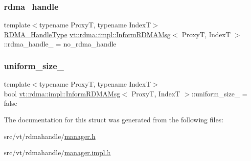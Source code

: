 \subsubsection{\texorpdfstring{rdma\+\_\+handle\+\_\+}{rdma\_handle\_}}
{\footnotesize\ttfamily template$<$typename ProxyT, typename IndexT$>$ \\
\hyperlink{namespacevt_a10442579ec4e7ebef223818e64bcf908}{R\+D\+M\+A\+\_\+\+Handle\+Type} \hyperlink{structvt_1_1rdma_1_1impl_1_1_inform_r_d_m_a_msg}{vt\+::rdma\+::impl\+::\+Inform\+R\+D\+M\+A\+Msg}$<$ ProxyT, IndexT $>$\+::rdma\+\_\+handle\+\_\+ = no\+\_\+rdma\+\_\+handle}

\mbox{\label{structvt_1_1rdma_1_1impl_1_1_inform_r_d_m_a_msg_a863c6d2d07d1cd4dc8ff73e4a3f052c2}} 
\subsubsection{\texorpdfstring{uniform\+\_\+size\+\_\+}{uniform\_size\_}}
{\footnotesize\ttfamily template$<$typename ProxyT, typename IndexT$>$ \\
bool \hyperlink{structvt_1_1rdma_1_1impl_1_1_inform_r_d_m_a_msg}{vt\+::rdma\+::impl\+::\+Inform\+R\+D\+M\+A\+Msg}$<$ ProxyT, IndexT $>$\+::uniform\+\_\+size\+\_\+ = false}



The documentation for this struct was generated from the following files\+:\begin{DoxyCompactItemize}
\item 
src/vt/rdmahandle/\hyperlink{rdmahandle_2manager_8h}{manager.\+h}\item 
src/vt/rdmahandle/\hyperlink{rdmahandle_2manager_8impl_8h}{manager.\+impl.\+h}\end{DoxyCompactItemize}
